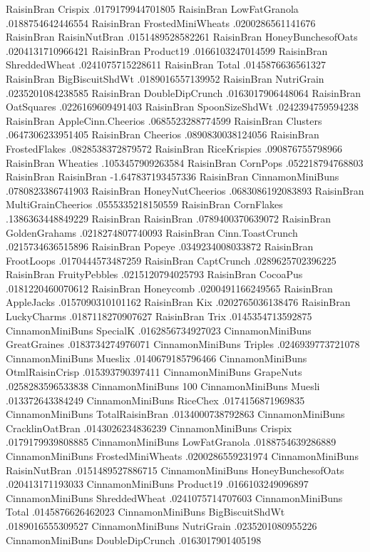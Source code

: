 RaisinBran	Crispix	.0179179944701805
RaisinBran	LowFatGranola	.0188754642446554
RaisinBran	FrostedMiniWheats	.0200286561141676
RaisinBran	RaisinNutBran	.0151489528582261
RaisinBran	HoneyBunchesofOats	.0204131710966421
RaisinBran	Product19	.0166103247014599
RaisinBran	ShreddedWheat	.0241075715228611
RaisinBran	Total	.0145876636561327
RaisinBran	BigBiscuitShdWt	.0189016557139952
RaisinBran	NutriGrain	.0235201084238585
RaisinBran	DoubleDipCrunch	.0163017906448064
RaisinBran	OatSquares	.0226169609491403
RaisinBran	SpoonSizeShdWt	.0242394759594238
RaisinBran	AppleCinn.Cheerios	.0685523288774599
RaisinBran	Clusters	.0647306233951405
RaisinBran	Cheerios	.0890830038124056
RaisinBran	FrostedFlakes	.0828538372879572
RaisinBran	RiceKrispies	.090876755798966
RaisinBran	Wheaties	.1053457909263584
RaisinBran	CornPops	.052218794768803
RaisinBran	RaisinBran	-1.647837193457336
RaisinBran	CinnamonMiniBuns	.0780823386741903
RaisinBran	HoneyNutCheerios	.0683086192083893
RaisinBran	MultiGrainCheerios	.0555335218150559
RaisinBran	CornFlakes	.1386363448849229
RaisinBran	RaisinBran	.0789400370639072
RaisinBran	GoldenGrahams	.0218274807740093
RaisinBran	Cinn.ToastCrunch	.0215734636515896
RaisinBran	Popeye	.0349234008033872
RaisinBran	FrootLoops	.0170444573487259
RaisinBran	CaptCrunch	.0289625702396225
RaisinBran	FruityPebbles	.0215120794025793
RaisinBran	CocoaPus	.0181220460070612
RaisinBran	Honeycomb	.0200491166249565
RaisinBran	AppleJacks	.0157090310101162
RaisinBran	Kix	.0202765036138476
RaisinBran	LuckyCharms	.0187118270907627
RaisinBran	Trix	.0145354713592875
CinnamonMiniBuns	SpecialK	.0162856734927023
CinnamonMiniBuns	GreatGraines	.0183734274976071
CinnamonMiniBuns	Triples	.0246939773721078
CinnamonMiniBuns	Mueslix	.0140679185796466
CinnamonMiniBuns	OtmlRaisinCrisp	.015393790397411
CinnamonMiniBuns	GrapeNuts	.0258283596533838
CinnamonMiniBuns	100%
CinnamonMiniBuns	Muesli	.013372643384249
CinnamonMiniBuns	RiceChex	.0174156871969835
CinnamonMiniBuns	TotalRaisinBran	.0134000738792863
CinnamonMiniBuns	CracklinOatBran	.0143026234836239
CinnamonMiniBuns	Crispix	.0179179939808885
CinnamonMiniBuns	LowFatGranola	.0188754639286889
CinnamonMiniBuns	FrostedMiniWheats	.0200286559231974
CinnamonMiniBuns	RaisinNutBran	.0151489527886715
CinnamonMiniBuns	HoneyBunchesofOats	.020413171193033
CinnamonMiniBuns	Product19	.0166103249096897
CinnamonMiniBuns	ShreddedWheat	.0241075714707603
CinnamonMiniBuns	Total	.0145876626462023
CinnamonMiniBuns	BigBiscuitShdWt	.0189016555309527
CinnamonMiniBuns	NutriGrain	.0235201080955226
CinnamonMiniBuns	DoubleDipCrunch	.0163017901405198
